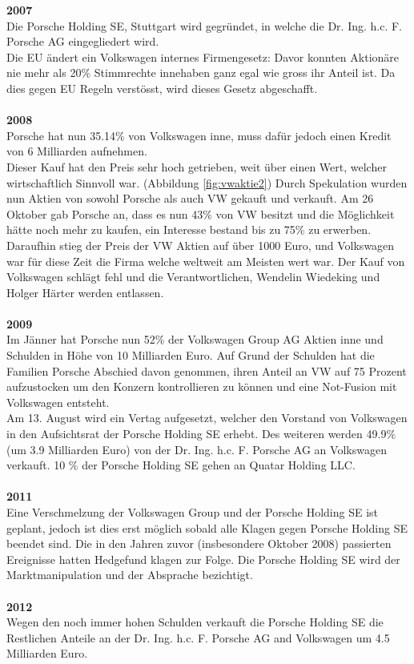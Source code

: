 \documentclass[12pt]{article}
\begin{document}
\textbf{2007}\\
Die Porsche Holding SE, Stuttgart wird gegründet, in welche die Dr. Ing. h.c. F. Porsche AG  eingegliedert wird.\\ Die EU ändert ein Volkswagen internes Firmengesetz: Davor konnten Aktionäre nie mehr als 20\% Stimmrechte innehaben ganz egal wie gross ihr Anteil ist. Da dies gegen EU Regeln verstösst, wird dieses Gesetz abgeschafft.\\\\
\textbf{2008}\\
Porsche hat nun 35.14\% von Volkswagen inne, muss dafür jedoch einen Kredit von 6 Milliarden aufnehmen. \\
Dieser Kauf hat den Preis sehr hoch getrieben, weit über einen Wert, welcher wirtschaftlich Sinnvoll war. (Abbildung \ref{fig:vwaktie2}) Durch Spekulation wurden nun Aktien von sowohl Porsche als auch VW gekauft und verkauft. Am 26 Oktober gab Porsche an, dass es nun 43\% von VW besitzt und die Möglichkeit hätte noch mehr zu kaufen, ein Interesse bestand bis zu 75\% zu erwerben. \\
Daraufhin stieg der Preis der VW Aktien auf über 1000 Euro, und Volkswagen war für diese Zeit die Firma welche weltweit am Meisten wert war. Der Kauf von Volkswagen schlägt fehl und die Verantwortlichen, Wendelin Wiedeking und Holger Härter werden entlassen.
\\\\
\textbf{2009}\\
Im Jänner hat Porsche nun 52\% der Volkswagen Group AG Aktien inne und Schulden in Höhe von 10 Milliarden Euro.
Auf Grund der Schulden hat die Familien Porsche Abschied davon genommen, ihren Anteil an VW auf 75 Prozent aufzustocken um den Konzern kontrollieren zu können und eine Not-Fusion mit Volkswagen entsteht. \\
Am 13. August wird ein Vertag aufgesetzt, welcher den Vorstand von Volkswagen in den Aufsichtsrat der Porsche Holding SE erhebt. Des weiteren werden 49.9\% (um 3.9 Milliarden Euro) von der Dr. Ing. h.c. F. Porsche AG an Volkswagen verkauft. 10 \% der Porsche Holding SE gehen an Quatar Holding LLC. \\\\
\textbf{2011}\\
Eine Verschmelzung der Volkswagen Group und der Porsche Holding SE ist geplant, jedoch ist dies erst möglich sobald alle Klagen gegen Porsche Holding SE beendet sind. Die in den Jahren zuvor (insbesondere Oktober 2008) passierten Ereignisse hatten Hedgefund klagen zur Folge. Die Porsche Holding SE wird der Marktmanipulation und der Absprache bezichtigt.\\\\
\textbf{2012}\\
Wegen den noch immer hohen Schulden verkauft die Porsche Holding SE die Restlichen Anteile an der  Dr. Ing. h.c. F. Porsche AG and Volkswagen um 4.5 Milliarden Euro.
\cite{squeezy}
\end{document}

